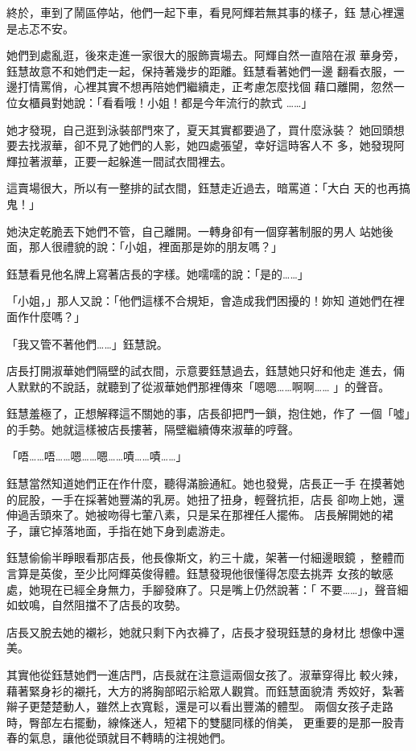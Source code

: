 終於，車到了鬧區停站，他們一起下車，看見阿輝若無其事的樣子，鈺
慧心裡還是忐忑不安。

她們到處亂逛，後來走進一家很大的服飾賣場去。阿輝自然一直陪在淑
華身旁，鈺慧故意不和她們走一起，保持著幾步的距離。鈺慧看著她們一邊
翻看衣服，一邊打情罵俏，心裡其實不想再陪她們繼續走，正考慮怎麼找個
藉口離開，忽然一位女櫃員對她說：「看看哦！小姐！都是今年流行的款式
……」

她才發現，自己逛到泳裝部門來了，夏天其實都要過了，買什麼泳裝？
她回頭想要去找淑華，卻不見了她們的人影，她四處張望，幸好這時客人不
多，她發現阿輝拉著淑華，正要一起躲進一間試衣間裡去。

這賣場很大，所以有一整排的試衣間，鈺慧走近過去，暗罵道：「大白
天的也再搞鬼！」

她決定乾脆丟下她們不管，自己離開。一轉身卻有一個穿著制服的男人
站她後面，那人很禮貌的說：「小姐，裡面那是妳的朋友嗎？」

鈺慧看見他名牌上寫著店長的字樣。她嚅嚅的說：「是的……」

「小姐，」那人又說：「他們這樣不合規矩，會造成我們困擾的！妳知
道她們在裡面作什麼嗎？」

「我又管不著他們……」鈺慧說。

店長打開淑華她們隔壁的試衣間，示意要鈺慧過去，鈺慧她只好和他走
進去，倆人默默的不說話，就聽到了從淑華她們那裡傳來「嗯嗯……啊啊……
」的聲音。

鈺慧羞極了，正想解釋這不關她的事，店長卻把門一鎖，抱住她，作了
一個「噓」的手勢。她就這樣被店長摟著，隔壁繼續傳來淑華的哼聲。

「唔……唔……嗯……嗯……嘖……嘖……」

鈺慧當然知道她們正在作什麼，聽得滿臉通紅。她也發覺，店長正一手
在摸著她的屁股，一手在採著她豐滿的乳房。她扭了扭身，輕聲抗拒，店長
卻吻上她，還伸過舌頭來了。她被吻得七葷八素，只是呆在那裡任人擺佈。
店長解開她的裙子，讓它掉落地面，手指在她下身到處游走。

鈺慧偷偷半睜眼看那店長，他長像斯文，約三十歲，架著一付細邊眼鏡
，整體而言算是英俊，至少比阿輝英俊得體。鈺慧發現他很懂得怎麼去挑弄
女孩的敏感處，她現在已經全身無力，手腳發麻了。只是嘴上仍然說著：「
不要……」，聲音細如蚊鳴，自然阻擋不了店長的攻勢。

店長又脫去她的襯衫，她就只剩下內衣褲了，店長才發現鈺慧的身材比
想像中還美。

其實他從鈺慧她們一進店門，店長就在注意這兩個女孩了。淑華穿得比
較火辣，藉著緊身衫的襯托，大方的將胸部昭示給眾人觀賞。而鈺慧面貌清
秀姣好，紮著辮子更楚楚動人，雖然上衣寬鬆，還是可以看出豐滿的體型。
兩個女孩子走路時，臀部左右擺動，線條迷人，短裙下的雙腿同樣的俏美，
更重要的是那一股青春的氣息，讓他從頭就目不轉睛的注視她們。

